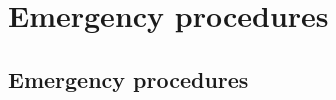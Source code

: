 \documentclass{book}
\begin{document}

\cleardoublepage
\emergencymatter
\part{Emergency procedures}
\chapter{Emergency procedures}

\cleardoublepage
\mainmatter

\end{document}
